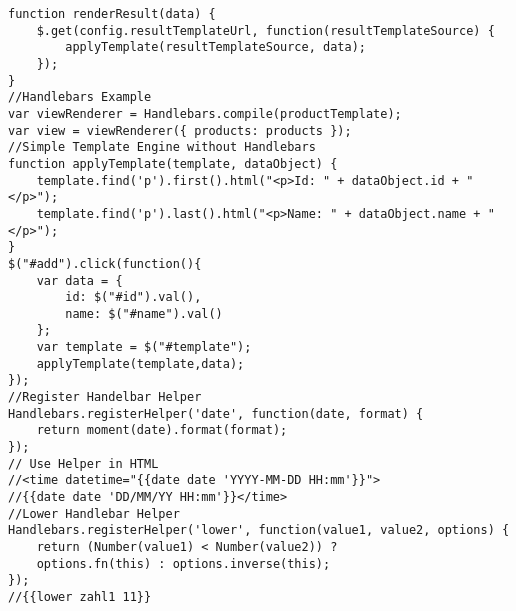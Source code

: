\begin{multicols*}{4}
\begin{verbatim}
function renderResult(data) {
	$.get(config.resultTemplateUrl, function(resultTemplateSource) {
		applyTemplate(resultTemplateSource, data);
	});
}
//Handlebars Example
var viewRenderer = Handlebars.compile(productTemplate);
var view = viewRenderer({ products: products });
//Simple Template Engine without Handlebars
function applyTemplate(template, dataObject) {
    template.find('p').first().html("<p>Id: " + dataObject.id + "</p>");
    template.find('p').last().html("<p>Name: " + dataObject.name + "</p>");
}
$("#add").click(function(){
    var data = {
        id: $("#id").val(),
        name: $("#name").val()
    };
    var template = $("#template");
    applyTemplate(template,data);
});
//Register Handelbar Helper
Handlebars.registerHelper('date', function(date, format) {
	return moment(date).format(format);
});
// Use Helper in HTML
//<time datetime="{{date date 'YYYY-MM-DD HH:mm'}}">
//{{date date 'DD/MM/YY HH:mm'}}</time>
//Lower Handlebar Helper
Handlebars.registerHelper('lower', function(value1, value2, options) {
	return (Number(value1) < Number(value2)) ? 
	options.fn(this) : options.inverse(this);
});
//{{lower zahl1 11}}
\end{verbatim}




\end{multicols*}
